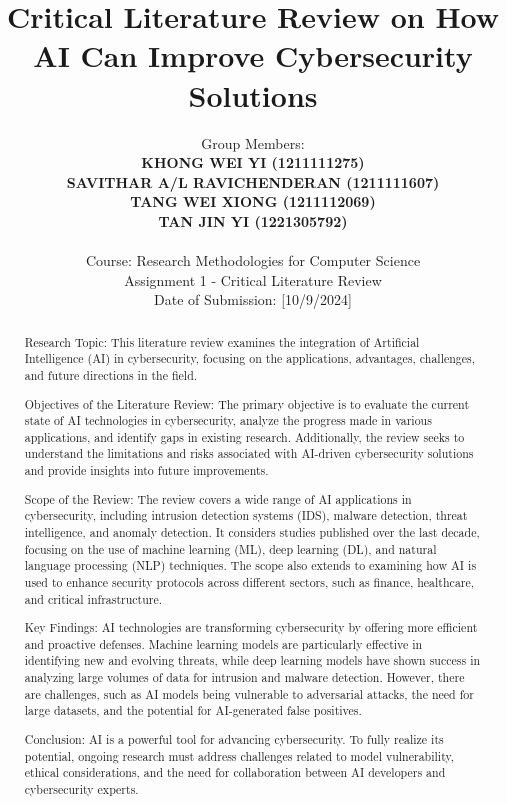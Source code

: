 \documentclass[12pt,a4paper]{article}
\title{Critical Literature Review on How AI Can Improve Cybersecurity Solutions}
\author{Group Members: \\
\textbf{KHONG WEI YI (1211111275)} \\
\textbf{SAVITHAR A/L RAVICHENDERAN (1211111607)} \\
\textbf{TANG WEI XIONG (1211112069)} \\
\textbf{TAN JIN YI (1221305792)} \\
\\
Course: Research Methodologies for Computer Science \\
Assignment 1 - Critical Literature Review \\
Date of Submission: [10/9/2024]}
\date{}
\begin{document}
\maketitle
\newpage

\begin{abstract}
    \noindent
    Research Topic: This literature review examines the integration of Artificial Intelligence (AI) in cybersecurity, focusing on the applications, advantages, challenges, and future directions in the field.

    Objectives of the Literature Review: The primary objective is to evaluate the current state of AI technologies in cybersecurity, analyze the progress made in various applications, and identify gaps in existing research. Additionally, the review seeks to understand the limitations and risks associated with AI-driven cybersecurity solutions and provide insights into future improvements.

    Scope of the Review: The review covers a wide range of AI applications in cybersecurity, including intrusion detection systems (IDS), malware detection, threat intelligence, and anomaly detection. It considers studies published over the last decade, focusing on the use of machine learning (ML), deep learning (DL), and natural language processing (NLP) techniques. The scope also extends to examining how AI is used to enhance security protocols across different sectors, such as finance, healthcare, and critical infrastructure.

    Key Findings: AI technologies are transforming cybersecurity by offering more efficient and proactive defenses. Machine learning models are particularly effective in identifying new and evolving threats, while deep learning models have shown success in analyzing large volumes of data for intrusion and malware detection. However, there are challenges, such as AI models being vulnerable to adversarial attacks, the need for large datasets, and the potential for AI-generated false positives.

    Conclusion: AI is a powerful tool for advancing cybersecurity. To fully realize its potential, ongoing research must address challenges related to model vulnerability, ethical considerations, and the need for collaboration between AI developers and cybersecurity experts.
\end{abstract}
\newpage

\tableofcontents
\newpage

\end{document}
